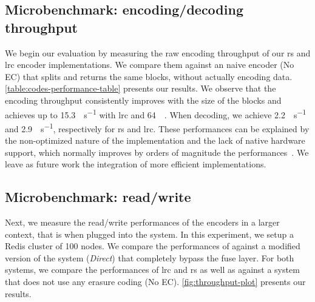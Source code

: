 \begin{table}
    \centering
    \caption{Workload characterization and erasure-coding overhead. Sizes are given in \si{\mega\byte}.}
    
    \label{fig:overhead-table}
\end{table}

\subsection{Microbenchmark: encoding/decoding throughput}%
\label{subsec:rw-perf}
We begin our evaluation by measuring the raw encoding throughput of our \ac{rs} and \ac{lrc} encoder implementations.
We compare them against an naive encoder (No EC) that splits and returns the same blocks, without actually encoding data.
\autoref{table:codes-performance-table} presents our results.
We observe that the encoding throughput consistently improves with the size of the blocks and achieves up to 15.3\si{\mega\byte\per\second} with \ac{lrc} and \SI{64}{\mega\byte}.
When decoding, we achieve 2.2\si{\mega\byte\per\second} and 2.9\si{\mega\byte\per\second}, respectively for \ac{rs} and \ac{lrc}.
These performances can be explained by the non-optimized nature of the implementation and the lack of native hardware support, which normally improves by orders of magnitude the performances~\cite{Burihabwa2016}. 
We leave as future work the integration of more efficient implementations.

\begin{table}
    \centering
    \caption{Encoding throughput of the different encoiders in \si{\mega\byte\per\second}}
    
    \label{table:codes-performance-table}
\end{table}

\subsection{Microbenchmark: read/write}
Next, we measure the read/write performances of the encoders in a larger context, that is when plugged into the \SYS system.
In this experiment, we setup a Redis cluster of 100 nodes.
We compare the performances of \SYS against a modified version of the system (\textit{Direct}) that completely bypass the \ac{fuse} layer.
For both systems, we compare the performances of \ac{lrc} and \ac{rs} as well as against a system that does not use any erasure coding (No EC).  
\autoref{fig:throughput-plot} presents our results.

